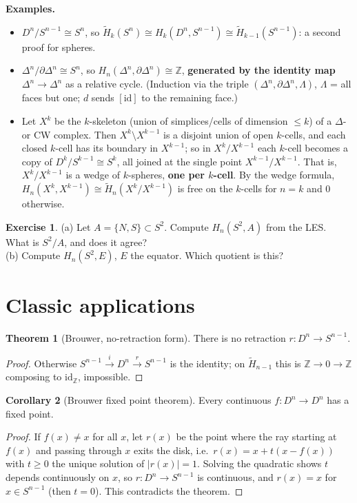 \documentclass[11pt]{article}
\newcommand{\Z}{\mathbb Z}
\newcommand{\Hred}{\tilde H}
\theoremstyle{definition}
\newtheorem{thm}{Theorem}[section]
\newtheorem{cor}[thm]{Corollary}
\newtheorem{exercise}{Exercise}[section]
\begin{document}
\textbf{Examples.}
\begin{itemize}
\item $D^n/S^{n-1}\cong S^n$, so $\Hred_k(S^n)\cong H_k(D^n,S^{n-1})\cong\Hred_{k-1}(S^{n-1})$: a second proof for spheres.
\item $\Delta^n/\partial\Delta^n\cong S^n$, so $H_n(\Delta^n,\partial\Delta^n)\cong\Z$, \textbf{generated by the identity map} $\Delta^n\to\Delta^n$ as a relative cycle. (Induction via the triple $(\Delta^n,\partial\Delta^n,\Lambda)$, $\Lambda$ = all faces but one; $d$ sends $[\mathrm{id}]$ to the remaining face.)
\item Let $X^k$ be the $k$-skeleton (union of simplices/cells of dimension $\le k$) of a $\Delta$- or CW complex. Then $X^k\setminus X^{k-1}$ is a disjoint union of open $k$-cells, and each closed $k$-cell has its boundary in $X^{k-1}$; so in $X^k/X^{k-1}$ each $k$-cell becomes a copy of $D^k/S^{k-1}\cong S^k$, all joined at the single point $X^{k-1}/X^{k-1}$. That is, $X^k/X^{k-1}$ is a wedge of $k$-spheres, \textbf{one per $k$-cell}. By the wedge formula, $H_n(X^k,X^{k-1})\cong\Hred_n(X^k/X^{k-1})$ is free on the $k$-cells for $n=k$ and $0$ otherwise.
\end{itemize}

\begin{exercise}\label{exr:pairs}
(a) Let $A=\{N,S\}\subset S^2$. Compute $H_n(S^2,A)$ from the LES. What is $S^2/A$, and does it agree?\\
(b) Compute $H_n(S^2,E)$, $E$ the equator. Which quotient is this?
\end{exercise}

\section{Classic applications}

\begin{thm}[Brouwer, no-retraction form]
There is no retraction $r:D^n\to S^{n-1}$.
\end{thm}
\begin{proof}
Otherwise $S^{n-1}\xrightarrow{i}D^n\xrightarrow{r}S^{n-1}$ is the identity; on $\Hred_{n-1}$ this is $\Z\to0\to\Z$ composing to $\mathrm{id}_\Z$, impossible.
\end{proof}
\begin{cor}[Brouwer fixed point theorem]
Every continuous $f:D^n\to D^n$ has a fixed point.
\end{cor}
\begin{proof}
If $f(x)\neq x$ for all $x$, let $r(x)$ be the point where the ray starting at $f(x)$ and passing through $x$ exits the disk, i.e.\ $r(x)=x+t(x-f(x))$ with $t\ge0$ the unique solution of $|r(x)|=1$. Solving the quadratic shows $t$ depends continuously on $x$, so $r:D^n\to S^{n-1}$ is continuous, and $r(x)=x$ for $x\in S^{n-1}$ (then $t=0$). This contradicts the theorem.
\end{proof}
\end{document}
